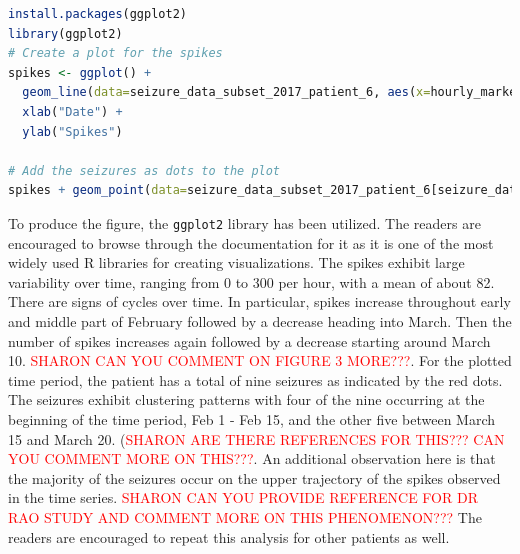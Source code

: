\begin{lstlisting}[language=R]
install.packages(ggplot2)
library(ggplot2)
# Create a plot for the spikes
spikes <- ggplot() +
  geom_line(data=seizure_data_subset_2017_patient_6, aes(x=hourly_markers, y=iea_lead_agg)) +
  xlab("Date") +
  ylab("Spikes")

# Add the seizures as dots to the plot
spikes + geom_point(data=seizure_data_subset_2017_patient_6[seizure_data_subset_2017_patient_6$le > 0, ], aes(x=hourly_markers, y=iea_lead_agg), color='red')
\end{lstlisting}
To produce the figure, the \verb|ggplot2| \cite{ggplot2} library has been utilized. The readers are encouraged to browse through the documentation for it as it is one of the most widely used R libraries for creating visualizations.
The spikes exhibit large variability over time, ranging from 0 to 300 per hour, with a mean of about 82. There are signs of cycles over time. In particular, spikes increase throughout early and middle part of February followed by a decrease heading into March. Then the number of spikes increases again followed by a decrease starting around March 10. \textcolor{red}{SHARON CAN YOU COMMENT ON FIGURE 3 MORE???}. For the plotted time period, the patient has a total of nine seizures as indicated by the red dots. The seizures exhibit clustering patterns with four of the nine occurring at the beginning of the time period, Feb 1 - Feb 15, and the other five between March 15 and March 20. (\textcolor{red}{SHARON ARE THERE REFERENCES FOR THIS??? CAN YOU COMMENT MORE ON THIS???}. An additional observation here is that the majority of the seizures occur on the upper trajectory of the spikes observed in the time series. \textcolor{red}{SHARON CAN YOU PROVIDE REFERENCE FOR DR RAO STUDY AND COMMENT MORE ON THIS PHENOMENON???}
The readers are encouraged to repeat this analysis for other patients as well.

